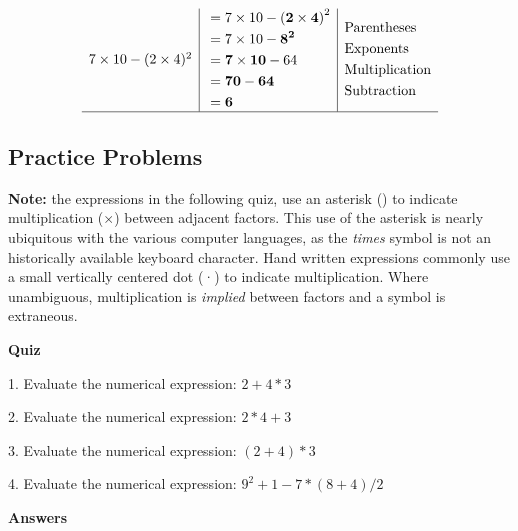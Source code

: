\[\begin{array}{c|c|c}
7 \times 10 - (2 \times 4)^2 &
\begin{aligned}
&= 7 \times 10 - \mathbf{(2 \times 4)}^2 \\
&= 7 \times 10 - \mathbf{8^2} \\
&= \mathbf{7 \times 10} - 64 \\
&= \mathbf{70 - 64} \\
&= \mathbf{6}
\end{aligned}
&
\begin{aligned}
&\text{Parentheses} \\
&\text{Exponents} \\
&\text{Multiplication} \\
&\text{Subtraction}
\end{aligned}
\\ \hline

\end{array}
\]




\subsection{Practice Problems}
\label{sss:prac-fe87}




\textbf{Note:} the expressions in the following quiz, use an asterisk (\*) to indicate multiplication ($\times$) between adjacent factors. This use of the asterisk is nearly ubiquitous with the various computer languages, as the \textit{times} symbol is not an historically available keyboard character. Hand written expressions commonly use a small vertically centered dot (·) to indicate multiplication. Where unambiguous, multiplication is \textit{implied} between factors and a symbol is extraneous. 



\textbf{Quiz}



1. Evaluate the numerical expression: $2+4*3$  

2. Evaluate the numerical expression: $2*4+3$  

3. Evaluate the numerical expression: $(2+4)*3$  

4. Evaluate the numerical expression: $9^2 + 1 - 7*(8+4)/2$



\textbf{Answers}



